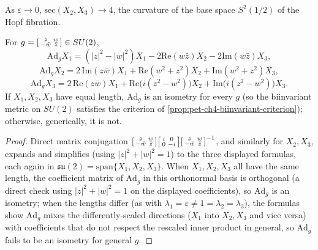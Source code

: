 \begin{remark}
  \label{rem:pet-ch4-berger-limit}
  As $\varepsilon\to0$, $\mathrm{sec}(X_2,X_3)\to4$, the curvature of the base
  space $S^2(1/2)$ of the Hopf fibration.
\end{remark}

\begin{proposition}
  \label{prop:pet-ch4-berger-adjoint-action}
  For $g=\begin{bsmallmatrix}z&w\\-\bar w&\bar z\end{bsmallmatrix}\in SU(2)$,
  \[
    \mathrm{Ad}_gX_1=(|z|^2-|w|^2)X_1-2\mathrm{Re}(w\bar z)X_2-2\mathrm{Im}(w\bar z)X_3,
  \]
  \[
    \mathrm{Ad}_gX_2=2\,\mathrm{Im}(z\bar w)X_1+\mathrm{Re}(w^2+z^2)X_2+\mathrm{Im}(w^2+z^2)X_3,
  \]
  \[
    \mathrm{Ad}_gX_3=2\,\mathrm{Re}(z\bar w)X_1+\mathrm{Re}\big(i(z^2-w^2)\big)X_2+\mathrm{Im}\big(i(z^2-w^2)\big)X_3.
  \]
  If $X_1,X_2,X_3$ have equal length, $\mathrm{Ad}_g$ is an isometry for every
  $g$ (so the biinvariant metric on $SU(2)$ satisfies the criterion of
  \cref{prop:pet-ch4-biinvariant-criterion}); otherwise, generically, it is
  not.
\end{proposition}
\begin{proof}
  Direct matrix conjugation
  $\begin{bsmallmatrix}z&w\\-\bar w&\bar z\end{bsmallmatrix}
  \begin{bsmallmatrix}i&0\\0&-i\end{bsmallmatrix}
  \begin{bsmallmatrix}z&w\\-\bar w&\bar z\end{bsmallmatrix}^{-1}$, and similarly
  for $X_2,X_3$, expands and simplifies (using $|z|^2+|w|^2=1$) to the three
  displayed formulas, each again in $\mathfrak{su}(2)=\mathrm{span}\{X_1,X_2,X_3\}$.
  When $X_1,X_2,X_3$ all have the same length, the coefficient matrix of
  $\mathrm{Ad}_g$ in this orthonormal basis is orthogonal (a direct check using
  $|z|^2+|w|^2=1$ on the displayed coefficients), so $\mathrm{Ad}_g$ is an
  isometry; when the lengths differ (as with $\lambda_1=\varepsilon\ne1=\lambda_2=\lambda_3$),
  the formulas show $\mathrm{Ad}_g$ mixes the differently-scaled directions
  ($X_1$ into $X_2,X_3$ and vice versa) with coefficients that do not respect
  the rescaled inner product in general, so $\mathrm{Ad}_g$ fails to be an
  isometry for general $g$.
\end{proof}


